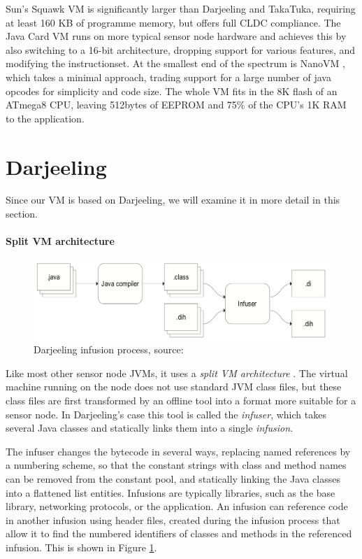 Sun's Squawk VM \cite{Shaylor:2003ws} is significantly larger than Darjeeling and TakaTuka, requiring at least 160 KB of programme memory, but offers full CLDC compliance. The Java Card VM \cite{javacard} runs on more typical sensor node hardware and achieves this by also switching to a 16-bit architecture, dropping support for various features, and modifying the instructionset. At the smallest end of the spectrum is NanoVM \cite{Harbaum}, which takes a minimal approach, trading support for a large number of java opcodes for simplicity and code size. The whole VM fits in the 8K flash of an ATmega8 CPU, leaving 512bytes of EEPROM and 75\% of the CPU's 1K RAM to the application.

\section{Darjeeling}
Since our VM is based on Darjeeling, we will examine it in more detail in this section.

\paragraph{Split VM architecture}
\begin{figure}
\centering
\includegraphics[width=0.6\linewidth]{darjeeling-infusion-process}
\caption[Darjeeling infusion process]{Darjeeling infusion process, source: \cite{Brouwers:2009cj}}
\label{fig-darjeeling-infusion-process}
\end{figure}
Like most other sensor node JVMs, it uses a \emph{split VM architecture} \cite{Simon:2006wd}. The virtual machine running on the node does not use standard JVM class files, but these class files are first transformed by an offline tool into a format more suitable for a sensor node. In Darjeeling's case this tool is called the \emph{infuser}, which takes several Java classes and statically links them into a single \emph{infusion}.

The infuser changes the bytecode in several ways, replacing named references by a numbering scheme, so that the constant strings with class and method names can be removed from the constant pool, and statically linking the Java classes into a flattened list entities. Infusions are typically libraries, such as the  base library, networking protocols, or the application. An infusion can reference code in another infusion using header files, created during the infusion process that allow it to find the numbered identifiers of classes and methods in the referenced infusion. This is shown in Figure \ref{fig-darjeeling-infusion-process}.

